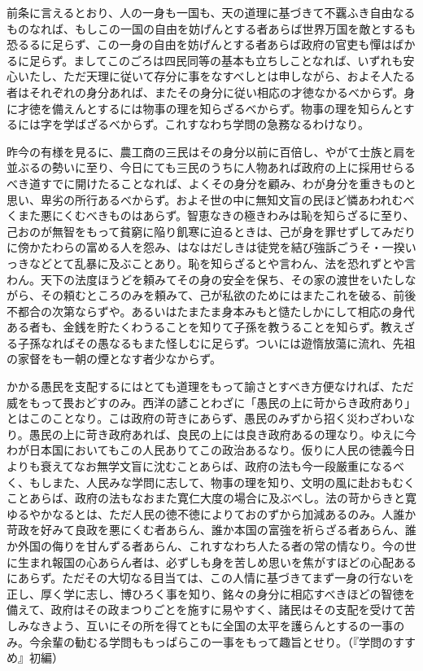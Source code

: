 前条に言えるとおり、人の一身も一国も、天の道理に基づきて不覊ふき自由なるものなれば、もしこの一国の自由を妨げんとする者あらば世界万国を敵とするも恐るるに足らず、この一身の自由を妨げんとする者あらば政府の官吏も憚はばかるに足らず。ましてこのごろは四民同等の基本も立ちしことなれば、いずれも安心いたし、ただ天理に従いて存分に事をなすべしとは申しながら、およそ人たる者はそれぞれの身分あれば、またその身分に従い相応の才徳なかるべからず。身に才徳を備えんとするには物事の理を知らざるべからず。物事の理を知らんとするには字を学ばざるべからず。これすなわち学問の急務なるわけなり。

昨今の有様を見るに、農工商の三民はその身分以前に百倍し、やがて士族と肩を並ぶるの勢いに至り、今日にても三民のうちに人物あれば政府の上に採用せらるべき道すでに開けたることなれば、よくその身分を顧み、わが身分を重きものと思い、卑劣の所行あるべからず。およそ世の中に無知文盲の民ほど憐あわれむべくまた悪にくむべきものはあらず。智恵なきの極きわみは恥を知らざるに至り、己おのが無智をもって貧窮に陥り飢寒に迫るときは、己が身を罪せずしてみだりに傍かたわらの富める人を怨み、はなはだしきは徒党を結び強訴ごうそ・一揆いっきなどとて乱暴に及ぶことあり。恥を知らざるとや言わん、法を恐れずとや言わん。天下の法度ほうどを頼みてその身の安全を保ち、その家の渡世をいたしながら、その頼むところのみを頼みて、己が私欲のためにはまたこれを破る、前後不都合の次第ならずや。あるいはたまたま身本みもと慥たしかにして相応の身代ある者も、金銭を貯たくわうることを知りて子孫を教うることを知らず。教えざる子孫なればその愚なるもまた怪しむに足らず。ついには遊惰放蕩に流れ、先祖の家督をも一朝の煙となす者少なからず。

かかる愚民を支配するにはとても道理をもって諭さとすべき方便なければ、ただ威をもって畏おどすのみ。西洋の諺ことわざに「愚民の上に苛からき政府あり」とはこのことなり。こは政府の苛きにあらず、愚民のみずから招く災わざわいなり。愚民の上に苛き政府あれば、良民の上には良き政府あるの理なり。ゆえに今わが日本国においてもこの人民ありてこの政治あるなり。仮りに人民の徳義今日よりも衰えてなお無学文盲に沈むことあらば、政府の法も今一段厳重になるべく、もしまた、人民みな学問に志して、物事の理を知り、文明の風に赴おもむくことあらば、政府の法もなおまた寛仁大度の場合に及ぶべし。法の苛からきと寛ゆるやかなるとは、ただ人民の徳不徳によりておのずから加減あるのみ。人誰か苛政を好みて良政を悪にくむ者あらん、誰か本国の富強を祈らざる者あらん、誰か外国の侮りを甘んずる者あらん、これすなわち人たる者の常の情なり。今の世に生まれ報国の心あらん者は、必ずしも身を苦しめ思いを焦がすほどの心配あるにあらず。ただその大切なる目当ては、この人情に基づきてまず一身の行ないを正し、厚く学に志し、博ひろく事を知り、銘々の身分に相応すべきほどの智徳を備えて、政府はその政まつりごとを施すに易やすく、諸民はその支配を受けて苦しみなきよう、互いにその所を得てともに全国の太平を護らんとするの一事のみ。今余輩の勧むる学問ももっぱらこの一事をもって趣旨とせり。（『学問のすすめ』初編）
\fi


